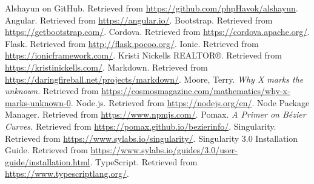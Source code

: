 \documentclass[12pt]{report}
\begin{document}
\begin{thebibliography}{9}
     Alshayun on GitHub. Retrieved from
        \url{https://github.com/phpHavok/alshayun}.
     Angular. Retrieved from \url{https://angular.io/}.
     Bootstrap. Retrieved from
        \url{https://getbootstrap.com/}.
     Cordova. Retrieved from \url{https://cordova.apache.org/}.
     Flask. Retrieved from \url{http://flask.pocoo.org/}.
     Ionic. Retrieved from \url{https://ionicframework.com/}.
     Kristi Nickells REALTOR®. Retrieved from
        \url{https://kristinickells.com/}.
     Markdown. Retrieved from
        \url{https://daringfireball.net/projects/markdown/}.
     Moore, Terry. \textit{Why X marks the unknown.} Retrieved
        from \url{https://cosmosmagazine.com/mathematics/why-x-marks-unknown-0}.
     Node\@.js. Retrieved from \url{https://nodejs.org/en/}.
     Node Package Manager. Retrieved from \url{https://www.npmjs.com/}.
     Pomax. \textit{A Primer on Bézier Curves.} Retrieved from
        \url{https://pomax.github.io/bezierinfo/}.
     Singularity. Retrieved from \url{https://www.sylabs.io/singularity/}.
     Singularity 3\@.0 Installation Guide. Retrieved
        from
        \url{https://www.sylabs.io/guides/3.0/user-guide/installation.html}.
     TypeScript. Retrieved from
        \url{https://www.typescriptlang.org/}.
\end{thebibliography}
\end{document}

